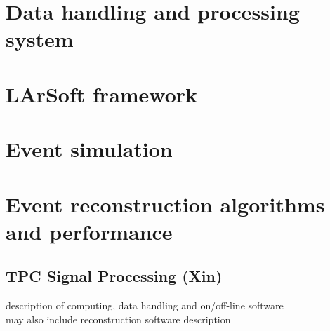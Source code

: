 
\section{Data handling and processing system}

\section{LArSoft framework}

\section{Event simulation}

\section{Event reconstruction algorithms and performance}

\subsection{TPC Signal Processing (Xin)}

description of computing, data handling and on/off-line software\\

may also include reconstruction software description

